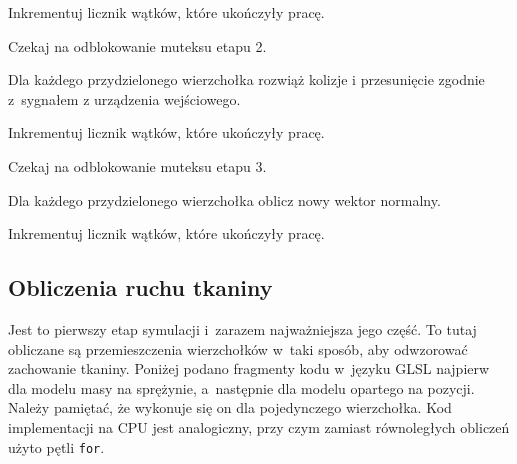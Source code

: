 \begin{algorithm}[H]
{				Inkrementuj licznik wątków, które ukończyły pracę.
				
				Czekaj na odblokowanie muteksu etapu 2.
				
				Dla każdego przydzielonego wierzchołka rozwiąż kolizje i przesunięcie zgodnie z~sygnałem z urządzenia wejściowego.
				
				Inkrementuj licznik wątków, które ukończyły pracę.
				
				Czekaj na odblokowanie muteksu etapu 3.
				
				Dla każdego przydzielonego wierzchołka oblicz nowy wektor normalny.
				
				Inkrementuj licznik wątków, które ukończyły pracę.
			}
			
			\Indm
		\end{algorithm}
			
		\subsection{Obliczenia ruchu tkaniny}
		\label{t:symulacja:dzialanie:ruch}
			
		
		Jest to pierwszy etap symulacji i~zarazem najważniejsza jego część. To tutaj obliczane są przemieszczenia wierzchołków w~taki sposób, aby odwzorować zachowanie tkaniny. Poniżej podano fragmenty kodu w~języku GLSL najpierw dla modelu masy na sprężynie, a~następnie dla modelu opartego na pozycji. Należy pamiętać, że wykonuje się on dla pojedynczego wierzchołka. Kod implementacji na CPU jest analogiczny, przy czym zamiast równoległych obliczeń użyto pętli \texttt{for}.
		\newline	
		

